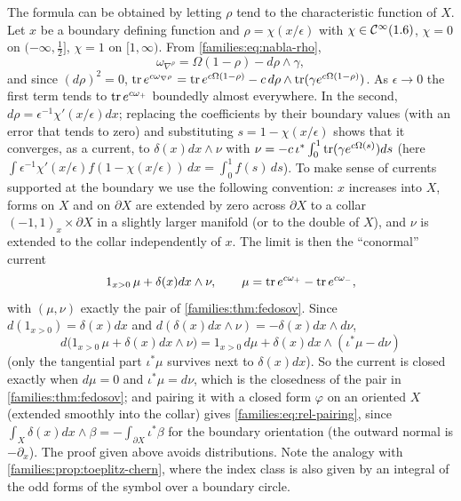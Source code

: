\begin{remark}\label{families:rem:conormal}
  The formula can be obtained by letting $\rho$ tend to the characteristic
  function of $X$. Let $x$ be a boundary defining function and
  $\rho=\chi(x/\epsilon)$ with $\chi\in\mathcal{C}^\infty(1.6)$, $\chi=0$ on $(-\infty,\frac12]$,
  $\chi=1$ on $[1,\infty)$. From \eqref{families:eq:nabla-rho},
  \begin{equation*}
    \omega_{\nabla^\rho}=\Omega(1-\rho)-d\rho\wedge\gamma,
  \end{equation*}
  and since $(d\rho)^2=0$, $\operatorname{tr} e^{c\omega_{\nabla^\rho}}=\operatorname{tr} e^{c\Omega(1-\rho)}
  -c\,d\rho\wedge\operatorname{tr}(\gamma e^{c\Omega(1-\rho)})$. As $\epsilon\to0$ the first
  term tends to $\operatorname{tr} e^{c\omega_+}$ boundedly almost everywhere. In the second,
  $d\rho=\epsilon^{-1}\chi'(x/\epsilon)dx$; replacing the coefficients by
  their boundary values (with an error that tends to zero) and substituting
  $s=1-\chi(x/\epsilon)$ shows that it converges, as a current, to
  $\delta(x)dx\wedge\nu$ with $\nu=-c\,\iota^*\int_0^1\operatorname{tr}(\gamma e^{c\Omega(s)})ds$
  (here $\int\epsilon^{-1}\chi'(x/\epsilon)f(1-\chi(x/\epsilon))\,dx=\int_0^1f(s)\,ds$).
  To make sense of currents supported at the boundary we use the following
  convention: $x$ increases into $X$, forms on $X$ and on $\partial X$ are
  extended by zero across $\partial X$ to a collar $(-1,1)_x\times\partial X$
  in a slightly larger manifold (or to the double of $X$), and $\nu$ is
  extended to the collar independently of $x$. The limit is then the
  ``conormal'' current
  \begin{equation*}
    1_{x>0}\,\mu+\delta(x)dx\wedge\nu,\qquad\mu=\operatorname{tr} e^{c\omega_+}-\operatorname{tr} e^{c\omega_-},
  \end{equation*}
  with $(\mu,\nu)$ exactly the pair of \cref{families:thm:fedosov}. Since
  $d(1_{x>0})=\delta(x)dx$ and $d(\delta(x)dx\wedge\nu)=-\delta(x)dx\wedge d\nu$,
  \begin{equation*}
    d\bigl(1_{x>0}\,\mu+\delta(x)dx\wedge\nu\bigr)=1_{x>0}\,d\mu
    +\delta(x)dx\wedge(\iota^*\mu-d\nu)
  \end{equation*}
  (only the tangential part $\iota^*\mu$ survives next to $\delta(x)dx$). So the
  current is closed exactly when $d\mu=0$ and $\iota^*\mu=d\nu$, which is the
  closedness of the pair in \cref{families:thm:fedosov}; and pairing it with a
  closed form $\varphi$ on an oriented $X$ (extended smoothly into the collar) gives \eqref{families:eq:rel-pairing},
  since $\int_X\delta(x)dx\wedge\beta=-\int_{\partial X}\iota^*\beta$ for the
  boundary orientation (the outward normal is $-\partial_x$). The proof given above avoids distributions.
  Note the analogy with \cref{families:prop:toeplitz-chern}, where the index
  class is also given by an integral of the odd forms of the symbol over a
  boundary circle.
\end{remark}

